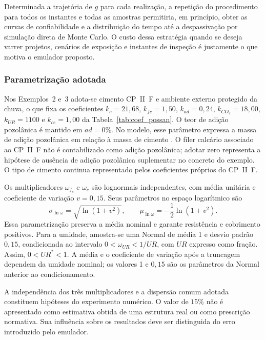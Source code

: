 Determinada a trajetória de $g$ para cada realização, a repetição do procedimento para todos os instantes e todas as amostras permitiria, em princípio, obter as curvas de confiabilidade e a distribuição do tempo até a despassivação por simulação direta de Monte Carlo. O custo dessa estratégia quando se deseja varrer projetos, cenários de exposição e instantes de inspeção é justamente o que motiva o emulador proposto.

\subsubsection{Parametriza\c{c}\~ao adotada}
\label{subsec:parametrizacao}

Nos Exemplos~2 e~3 adota-se cimento CP~II~F e ambiente externo protegido da chuva, o que fixa os coeficientes $k_c = 21{,}68$, $k_{fc} = 1{,}50$, $k_{ad} = 0{,}24$, $k_{CO_2} = 18{,}00$, $k_{UR} = 1100$ e $k_{ce} = 1{,}00$ da Tabela~\ref{tab:coef_possan}. O teor de adição pozolânica é mantido em $ad=0\%$. No modelo, esse parâmetro expressa a massa de adição pozolânica em relação à massa de cimento \parencite{possan2016co2}. O fíler calcário associado ao CP~II~F não é contabilizado como adição pozolânica; adotar zero representa a hipótese de ausência de adição pozolânica suplementar no concreto do exemplo. O tipo de cimento continua representado pelos coeficientes próprios do CP~II~F.

Os multiplicadores $\omega_{f_c}$ e $\omega_c$ são lognormais independentes, com média unitária e coeficiente de variação $v=0{,}15$. Seus parâmetros no espaço logarítmico são
\begin{equation}
    \sigma_{\ln\omega}=\sqrt{\ln(1+v^2)},\qquad
    \mu_{\ln\omega}=-\frac{1}{2}\ln(1+v^2).
    \label{eq:latentes_logormais}
\end{equation}
Essa parametrização preserva a média nominal e garante resistência e cobrimento positivos. Para a umidade, amostra-se uma Normal de média 1 e desvio padrão $0{,}15$, condicionada ao intervalo $0<\omega_{UR}<1/UR$, com $UR$ expresso como fração. Assim, $0<UR^{\ast}<1$. A média e o coeficiente de variação após a truncagem dependem da umidade nominal; os valores 1 e $0{,}15$ são os parâmetros da Normal anterior ao condicionamento.

A independência dos três multiplicadores e a dispersão comum adotada constituem hipóteses do experimento numérico. O valor de $15\%$ não é apresentado como estimativa obtida de uma estrutura real ou como prescrição normativa. Sua influência sobre os resultados deve ser distinguida do erro introduzido pelo emulador.

